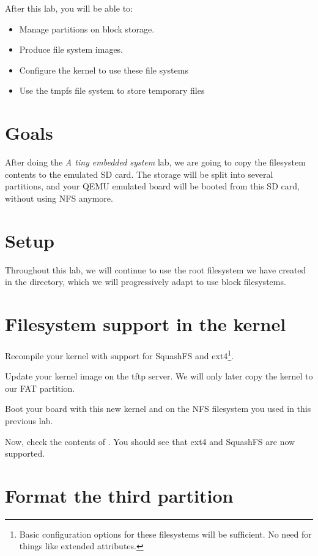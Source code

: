 
After this lab, you will be able to:
\begin{itemize}
\item Manage partitions on block storage.
\item Produce file system images.
\item Configure the kernel to use these file systems
\item Use the tmpfs file system to store temporary files
\end{itemize}

\section{Goals}

After doing the {\em A tiny embedded system} lab, we are going to copy
the filesystem contents to the emulated SD card. The storage will be
split into several partitions, and your QEMU emulated board will
be booted from this SD card, without using NFS anymore.

\section{Setup}

Throughout this lab, we will continue to use the root filesystem we
have created in the 
directory, which we will progressively adapt to use block filesystems.

\section{Filesystem support in the kernel}

Recompile your kernel with support for SquashFS and ext4\footnote{Basic
configuration options for these filesystems will be sufficient. No need
for things like extended attributes.}.

Update your kernel image on the tftp server. We will only later copy
the kernel to our FAT partition.

Boot your board with this new kernel and on the NFS filesystem you
used in this previous lab.

Now, check the contents of . You should see
 that ext4 and SquashFS are now supported.

\section{Format the third partition}

